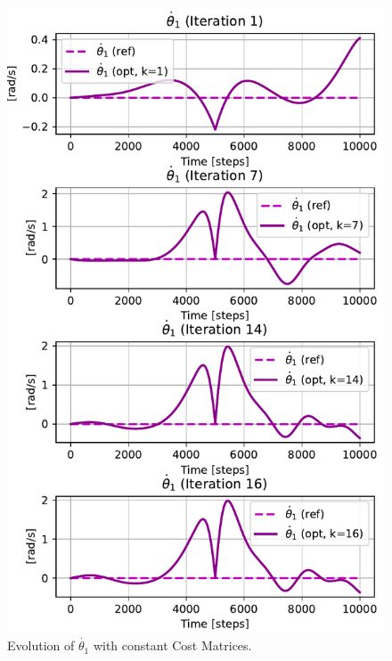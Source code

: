 \begin{figure}[htb]
    \centering
    \includegraphics[width=0.9\linewidth]{img/1-Task1/th1dot_const.pdf}
    \caption{Evolution of $\dot{\theta_1}$ with constant Cost Matrices.}
    \label{fig:th1dot_const}
\end{figure}


